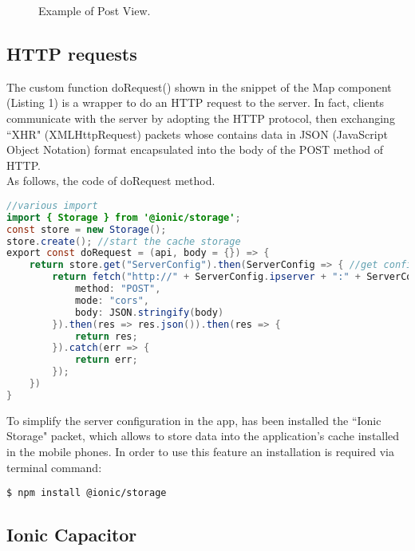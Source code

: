\documentclass[conference]{IEEEtran}
\begin{document}
\begin{figure}[htbp]
\begin{center}
\end{center}
\caption{Example of Post View.}
\label{fig}
\end{figure}


\subsection{HTTP requests}

The custom function doRequest() shown in the snippet of the Map component (Listing 1) is a wrapper to do an HTTP request to the server.
In fact, clients communicate with the server by adopting the HTTP protocol, then exchanging ``XHR" (XMLHttpRequest) packets whose contains data in JSON (JavaScript Object Notation) format encapsulated into the body of the POST method of HTTP.
\\
As follows, the code of doRequest method.
\begin{lstlisting}[language=Java, caption=Method doRequest to fetch server]
//various import 
import { Storage } from '@ionic/storage';
const store = new Storage(); 
store.create(); //start the cache storage
export const doRequest = (api, body = {}) => {
    return store.get("ServerConfig").then(ServerConfig => { //get config from cache
        return fetch("http://" + ServerConfig.ipserver + ":" + ServerConfig.port + "/" + api, {
            method: "POST",
            mode: "cors",
            body: JSON.stringify(body)
        }).then(res => res.json()).then(res => {
            return res;
        }).catch(err => {
            return err;
        });
    })
}
\end{lstlisting}


To simplify the server configuration in the app, has been installed the ``Ionic Storage" \cite{b9} packet, which allows to store data into the application's cache installed in the mobile phones. In order to use this feature an installation is required via terminal command: 
\begin{lstlisting}[language=Sh]
$ npm install @ionic/storage
\end{lstlisting}



\subsection{Ionic Capacitor}
\end{document}
